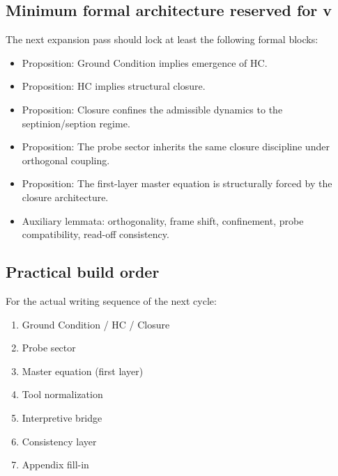 \subsection*{Minimum formal architecture reserved for v\docversion}
The next expansion pass should lock at least the following formal blocks:
\begin{itemize}[leftmargin=2em]
  \item Proposition: Ground Condition implies emergence of HC.
  \item Proposition: HC implies structural closure.
  \item Proposition: Closure confines the admissible dynamics to the septinion/seption regime.
  \item Proposition: The probe sector inherits the same closure discipline under orthogonal coupling.
  \item Proposition: The first-layer master equation is structurally forced by the closure architecture.
  \item Auxiliary lemmata: orthogonality, frame shift, confinement, probe compatibility, read-off consistency.
\end{itemize}

\subsection*{Practical build order}
For the actual writing sequence of the next cycle:
\begin{enumerate}[leftmargin=2em]
  \item Ground Condition / HC / Closure
  \item Probe sector
  \item Master equation (first layer)
  \item Tool normalization
  \item Interpretive bridge
  \item Consistency layer
  \item Appendix fill-in
\end{enumerate}



\clearpage
